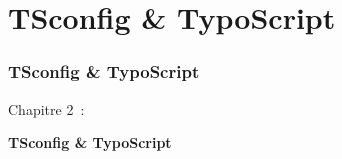 %

\section{TSconfig \& TypoScript}
\begin{frame}[fragile]
	\frametitle{TSconfig \& TypoScript}

	\begin{center}\huge{Chapitre 2~:}\end{center}
	\begin{center}\huge{\color{typo3darkgrey}\textbf{TSconfig \& TypoScript}}\end{center}

\end{frame}


